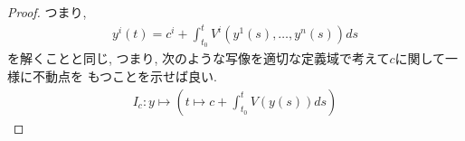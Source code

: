 \documentclass{ltjsarticle}
\begin{document}
  \begin{proof}
    つまり, 
     \begin{equation}
      \begin{aligned}
        y^i(t) = c^i + \int_{t_0}^t V^i(y^1(s), \ldots , y^n(s)) ds
      \end{aligned}
    \end{equation} 
    を解くことと同じ, つまり, 次のような写像を適切な定義域で考えて$c$に関して一様に不動点を
    もつことを示せば良い. 
     \begin{equation}
      \begin{aligned}
        I_c : y \mapsto \left( t \mapsto c + \int_{t_0}^t V(y(s)) ds \right) 
      \end{aligned}
    \end{equation} 
  \end{proof}
\end{document}
